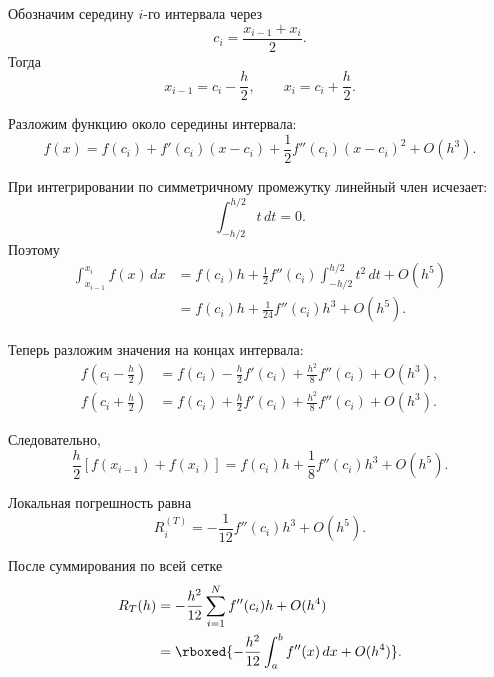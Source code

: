 \documentclass[../final.tex]{subfiles}
\begin{document}
Обозначим середину $i$-го интервала через
%
\begin{equation*}
    c_i=\frac{x_{i-1}+x_i}{2}.
\end{equation*}
%
Тогда
%
\begin{equation*}
    x_{i-1}=c_i-\frac h2,
    \qquad
    x_i=c_i+\frac h2.
\end{equation*}

Разложим функцию около середины интервала:
%
\begin{equation*}
    f(x)
    =
    f(c_i)
    +f'(c_i)(x-c_i)
    +\frac12 f''(c_i)(x-c_i)^2
    +O(h^3).
\end{equation*}

При интегрировании по симметричному промежутку линейный член исчезает:
%
\begin{equation*}
    \int_{-h/2}^{h/2}t\,dt=0.
\end{equation*}
%
Поэтому
%
\begin{align*}
    \int_{x_{i-1}}^{x_i}f(x)\,dx
    &=
    f(c_i)h
    +\frac12 f''(c_i)
    \int_{-h/2}^{h/2}t^2\,dt
    +O(h^5)\\
    &=
    f(c_i)h
    +\frac{1}{24}f''(c_i)h^3
    +O(h^5).
\end{align*}

Теперь разложим значения на концах интервала:
%
\begin{align*}
    f\!\left(c_i-\frac h2\right)
    &=
    f(c_i)-\frac h2 f'(c_i)
    +\frac{h^2}{8}f''(c_i)
    +O(h^3),\\
    f\!\left(c_i+\frac h2\right)
    &=
    f(c_i)+\frac h2 f'(c_i)
    +\frac{h^2}{8}f''(c_i)
    +O(h^3).
\end{align*}

Следовательно,
%
\begin{equation*}
    \frac h2
    \left[
        f(x_{i-1})+f(x_i)
    \right]
    =
    f(c_i)h
    +\frac18 f''(c_i)h^3
    +O(h^5).
\end{equation*}

Локальная погрешность равна
%
\begin{equation*}
    R_i^{(T)}
    =
    -\frac1{12}f''(c_i)h^3
    +O(h^5).
\end{equation*}

После суммирования по всей сетке
%
\begin{align*}
    R_T(h)
    &=
    -\frac{h^2}{12}
    \sum_{i=1}^{N}f''(c_i)h
    +O(h^4)\\
    &=
    \rboxed{
    -\frac{h^2}{12}\int_a^b f''(x)\,dx
    +O(h^4)
    }.
\end{align*}
\end{document}

